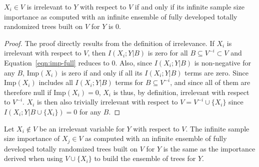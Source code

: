\begin{theorem}\label{thm:irrelevant}
  $X_i \in V$ is irrelevant to $Y$ with respect to $V$ if and only if  its
  infinite sample size importance as computed with an infinite ensemble of fully
  developed totally randomized trees built on $V$ for $Y$ is 0.
\end{theorem}

\begin{proof}
The proof directly results from the definition of irrelevance. If $X_i$ is
irrelevant with respect to $V$, then $I(X_i;Y|B)$ is zero for all $B \subseteq
V^{-i} \subset V$ and Equation~\ref{eqn:imp-full} reduces to $0$. Also, since
$I(X_i;Y|B)$ is non-negative for any $B$, $\text{Imp}(X_i)$ is zero if and only if all
its $I(X_i;Y|B)$ terms are zero. Since $\text{Imp}(X_i)$ includes all $I(X_i;Y|B)$
terms for $B \subseteq V^{-i}$, and since all of them are therefore null if
$\text{Imp}(X_i)=0$,  $X_i$ is thus, by definition, irrelevant with respect to
$V^{-i}$. $X_i$ is then also trivially irrelevant with respect to $V=V^{-i} \cup
\{X_i\}$ since $I(X_i;Y|B\cup\{X_i\})=0$ for any $B$.
\end{proof}

\begin{lemma}\label{lemma:adding-irrelevant}
  Let $X_i \notin V$ be an irrelevant variable for $Y$ with respect to $V$. The infinite
  sample size importance of $X_j \in V$ as computed with an infinite
  ensemble of fully developed totally randomized trees built on $V$ for $Y$ is the
  same as the importance derived when using $V\cup \{X_i\}$ to build the ensemble of trees for $Y$.
\end{lemma}

